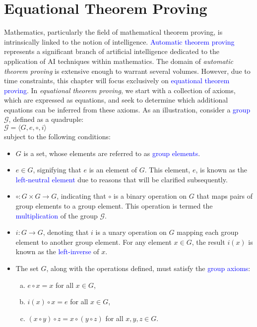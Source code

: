 \chapter{Equational Theorem Proving}
Mathematics, particularly the field of mathematical theorem proving, is intrinsically linked to the notion of
intelligence. \textcolor{blue}{Automatic theorem proving} represents a significant branch of artificial
intelligence dedicated to the application of AI techniques within mathematics. The domain of \emph{automatic
  theorem proving} is extensive enough to warrant several volumes. However, due to time constraints, this
chapter will focus exclusively on \textcolor{blue}{equational theorem proving}. In \emph{equational theorem
  proving}, we start with a collection of axioms, which are expressed as equations, and seek to determine which
additional equations can be inferred from these axioms. As an illustration, consider a \textcolor{blue}{group}
$\mathcal{G}$, defined as a quadruple: 
\\[0.2cm]
\hspace*{1.3cm}
$\mathcal{G} = \langle G, e, \circ, i \rangle$
\\[0.2cm]
subject to the following conditions:
\begin{itemize}
    \item $G$ is a set, whose elements are referred to as \textcolor{blue}{group elements}.
    \item $e \in G$, signifying that $e$ is an element of $G$. This element, $e$, is known as the
          \textcolor{blue}{left-neutral element} due to reasons that will be clarified subsequently. 
    \item $\circ: G \times G \rightarrow G$, indicating that $\circ$ is a binary operation on $G$ that maps
          pairs of group elements to a group element. This operation is termed the \textcolor{blue}{multiplication}
          of the group $\mathcal{G}$. 
    \item $i: G \rightarrow G$, denoting that $i$ is a unary operation on $G$ mapping each group element to
          another group element. For any element $x \in G$, the result $i(x)$ is known as the
          \textcolor{blue}{left-inverse} of $x$. 
    \item The set $G$, along with the operations defined, must satisfy the \textcolor{blue}{group axioms}:  
      \begin{enumerate}[(a)]
          \item $e \circ x = x$ for all $x \in G$,
          \item $i(x) \circ x = e$ for all $x \in G$,
          \item $(x \circ y) \circ z = x \circ (y \circ z)$ for all $x, y, z \in G$.
      \end{enumerate}
\end{itemize}
